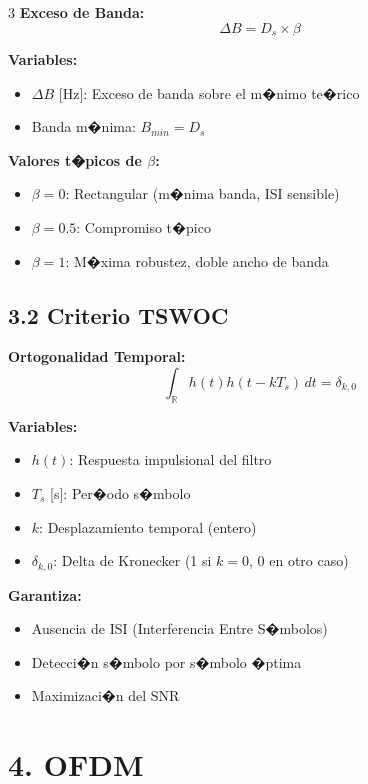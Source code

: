 ﻿\documentclass[8pt,a4paper]{article}
\begin{document}
\begin{multicols}{3}
\textbf{Exceso de Banda:}
\[
\Delta B = D_s \times \beta
\]

\textbf{Variables:}
\begin{itemize}[leftmargin=*,itemsep=0pt]
    \item $\Delta B$ [Hz]: Exceso de banda sobre el m�nimo te�rico
    \item Banda m�nima: $B_{min} = D_s$
\end{itemize}

\textbf{Valores t�picos de $\beta$:}
\begin{itemize}[leftmargin=*,itemsep=0pt]
    \item $\beta = 0$: Rectangular (m�nima banda, ISI sensible)
    \item $\beta = 0.5$: Compromiso t�pico
    \item $\beta = 1$: M�xima robustez, doble ancho de banda
\end{itemize}

\vspace{-2mm}
\subsection*{\small 3.2 Criterio TSWOC}
\vspace{-2mm}

\textbf{Ortogonalidad Temporal:}
\[
\int_{\mathbb{R}} h(t) h(t - kT_s)\, dt = \delta_{k,0}
\]

\textbf{Variables:}
\begin{itemize}[leftmargin=*,itemsep=0pt]
    \item $h(t)$: Respuesta impulsional del filtro
    \item $T_s$ [s]: Per�odo s�mbolo
    \item $k$: Desplazamiento temporal (entero)
    \item $\delta_{k,0}$: Delta de Kronecker (1 si $k=0$, 0 en otro caso)
\end{itemize}

\textbf{Garantiza:}
\begin{itemize}[leftmargin=*,itemsep=0pt]
    \item Ausencia de ISI (Interferencia Entre S�mbolos)
    \item Detecci�n s�mbolo por s�mbolo �ptima
    \item Maximizaci�n del SNR
\end{itemize}

\vspace{-2mm}
\section*{\color{sectioncolor}\normalsize 4. OFDM}
\vspace{-3mm}


\end{multicols}
\end{document}
